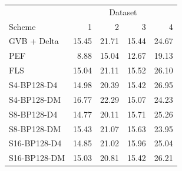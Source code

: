\begin{tabular}{lrrrr}
\toprule
 & \multicolumn{4}{c}{Dataset} \\
Scheme & 1 & 2 & 3 & 4 \\
\midrule
GVB + Delta & 15.45 & 21.71 & 15.44 & 24.67 \\
PEF & 8.88 & 15.04 & 12.67 & 19.13 \\
FLS & 15.04 & 21.11 & 15.52 & 26.10 \\
S4-BP128-D4 & 14.98 & 20.39 & 15.42 & 26.95 \\
S4-BP128-DM & 16.77 & 22.29 & 15.07 & 24.23 \\
S8-BP128-D4 & 14.77 & 20.11 & 15.71 & 25.26 \\
S8-BP128-DM & 15.43 & 21.07 & 15.63 & 23.95 \\
S16-BP128-D4 & 14.85 & 21.02 & 15.96 & 25.04 \\
S16-BP128-DM & 15.03 & 20.81 & 15.42 & 26.21 \\
\bottomrule
\end{tabular}
